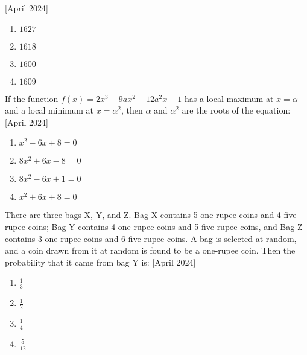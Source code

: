     \hfill{[April 2024]}
    \begin{enumerate}
        \item $1627$
        \item $1618$
        \item $1600$
        \item $1609$
    \end{enumerate}
    \item If the function $f(x) = 2x^3 - 9ax^2 + 12a^2x + 1$ has a local maximum at $x = \alpha$ and a local minimum at $x = \alpha^2$, then $\alpha$ and $\alpha^2$ are the roots of the equation:
    \hfill{[April 2024]}
    \begin{enumerate}
        \item $x^2 - 6x + 8 = 0$
        \item $8x^2 + 6x - 8 = 0$
        \item $8x^2 - 6x + 1 = 0$
        \item $x^2 + 6x + 8 = 0$
    \end{enumerate}
    \item There are three bags X, Y, and Z. Bag X contains 5 one-rupee coins and 4 five-rupee coins; Bag Y contains 4 one-rupee coins and 5 five-rupee coins, and Bag Z contains 3 one-rupee coins and 6 five-rupee coins. A bag is selected at random, and a coin drawn from it at random is found to be a one-rupee coin. Then the probability that it came from bag Y is:
    \hfill{[April 2024]}
    \begin{enumerate}
        \item $\frac{1}{3}$
        \item $\frac{1}{2}$
        \item $\frac{1}{4}$
        \item $\frac{5}{12}$
    \end{enumerate}

